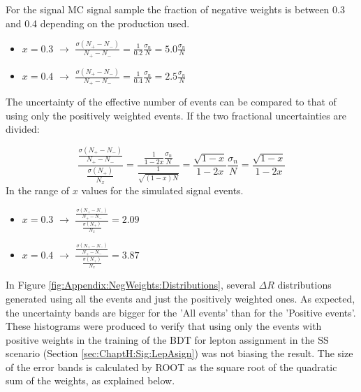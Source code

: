 For the signal \tHq \dileptau MC signal sample the fraction of negative weights is between 0.3 and 0.4 depending on the production used.
\begin{itemize}
	\item $x=0.3$	$\rightarrow$ $\frac{\sigma(N_{+} - N_{-})}{N_{+} - N_{-}}
	 = \frac{1}{0.2}\frac{\sigma_n}{N} = 5.0 \frac{\sigma_n}{N}$

	 \item $x=0.4$	$\rightarrow$ $\frac{\sigma(N_{+} - N_{-})}{N_{+} - N_{-}}
	 = \frac{1}{0.4}\frac{\sigma_n}{N} = 2.5 \frac{\sigma_n}{N}$
\end{itemize}

The uncertainty of the effective number of events can be compared to that of using only the 
positively weighted events. If the two fractional uncertainties are divided:

\begin{equation*}
	\frac{\frac{\sigma(N_{+} - N_{-})}{N_{+} - N_{-}}}{\frac{\sigma(N_+)}{N_x}}=
	\frac{\frac{1}{1-2x}\frac{\sigma_n}{N}}{\frac{1}{\sqrt{(1-x)N}}} =
	\frac{\sqrt{1-x}}{1-2x} \frac{\sigma_n}{N} = \frac{\sqrt{1-x}}{1-2x}
\end{equation*}
In the range of $x$ values for the \dileptau simulated signal events. 

\begin{minipage}[t]{0.57\linewidth}
\begin{itemize}
	\item $x=0.3$	$\rightarrow$ 
	$\frac{\frac{\sigma(N_{+} - N_{-})}{N_{+} - N_{-}}}{\frac{\sigma(N_+)}{N_x}}= 2.09$
	 \item $x=0.4$	$\rightarrow$ 
	$\frac{\frac{\sigma(N_{+} - N_{-})}{N_{+} - N_{-}}}{\frac{\sigma(N_+)}{N_x}}= 3.87$
\end{itemize}
\end{minipage}
\hfill
{}



In Figure \ref{fig:Appendix:NegWeights:Distributions}, several $\Delta R$ distributions generated using all the events
and just the positively weighted ones. As expected, the uncertainty bands are bigger for the 'All events' than for the
'Positive events'.  These histograms were produced to verify that using only the events with positive weights in
the training of the BDT for lepton assignment in the SS scenario (Section \ref{sec:ChaptH:Sig:LepAsign}) was not 
biasing the result. The size of the error bands is calculated by ROOT as the square root of the quadratic sum of the 
weights, as explained below.



